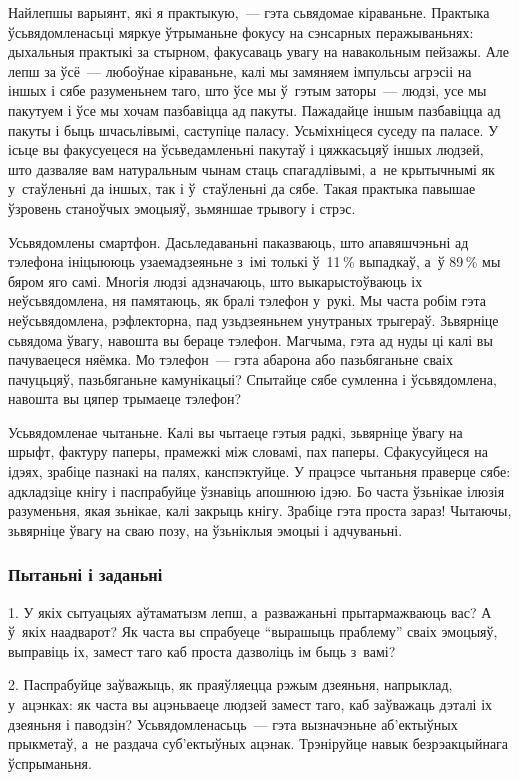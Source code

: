 Найлепшы варыянт, які я практыкую,~--- гэта сьвядомае кіраваньне. Практыка ўсьвядомленасьці мяркуе ўтрыманьне фокусу на сэнсарных перажываньнях: дыхальныя практыкі за стырном, факусаваць увагу на навакольным пейзажы. Але лепш за ўсё~--- любоўнае кіраваньне, калі мы замяняем імпульсы агрэсіі на іншых і сябе разуменьнем таго, што ўсе мы ў~гэтым заторы~--- людзі, усе мы пакутуем і ўсе мы хочам пазбавіцца ад пакуты. Пажадайце іншым пазбавіцца ад пакуты і быць шчасьлівымі, саступіце паласу. Усьміхніцеся суседу па паласе. У ісьце вы факусуецеся на ўсьведамленьні пакутаў і цяжкасьцяў іншых людзей, што дазваляе вам натуральным чынам стаць спагадлівымі, а~не крытычнымі як у~стаўленьні да іншых, так і ў~стаўленьні да сябе. Такая практыка павышае ўзровень станоўчых эмоцыяў, зьмяншае трывогу і стрэс.

Усьвядомлены смартфон. Дасьледаваньні паказваюць, што апавяшчэньні ад тэлефона ініцыююць узаемадзеяньне з~імі толькі ў~11\,\% выпадкаў, а~ў 89\,\% мы бяром яго самі. Многія людзі адзначаюць, што выкарыстоўваюць іх неўсьвядомлена, ня памятаюць, як бралі тэлефон у~рукі. Мы часта робім гэта неўсьвядомлена, рэфлекторна, пад узьдзеяньнем унутраных трыгераў. Зьвярніце сьвядома ўвагу, навошта вы бераце тэлефон. Магчыма, гэта ад нуды ці калі вы пачуваецеся няёмка. Мо тэлефон~--- гэта абарона або пазьбяганьне сваіх пачуцьцяў, пазьбяганьне камунікацыі? Спытайце сябе сумленна і ўсьвядомлена, навошта вы цяпер трымаеце тэлефон?

Усьвядомленае чытаньне. Калі вы чытаеце гэтыя радкі, зьвярніце ўвагу на шрыфт, фактуру паперы, прамежкі між словамі, пах паперы. Сфакусуйцеся на ідэях, зрабіце пазнакі на палях, канспэктуйце. У працэсе чытаньня праверце сябе: адкладзіце кнігу і паспрабуйце ўзнавіць апошнюю ідэю. Бо часта ўзьнікае ілюзія разуменьня, якая зьнікае, калі закрыць кнігу. Зрабіце гэта проста зараз! Чытаючы, зьвярніце ўвагу на сваю позу, на ўзьніклыя эмоцыі і адчуваньні.

\subsubsection{Пытаньні і заданьні}

1. У якіх сытуацыях аўтаматызм лепш, а~разважаньні прытармажваюць вас? А ў~якіх наадварот? Як часта вы спрабуеце ``вырашыць праблему'' сваіх эмоцыяў, выправіць іх, замест таго каб проста дазволіць ім быць з~вамі?

2. Паспрабуйце заўважыць, як праяўляецца рэжым дзеяньня, напрыклад, у~ацэнках: як часта вы ацэньваеце людзей замест таго, каб заўважаць дэталі іх дзеяньня і паводзін? Усьвядомленасьць~--- гэта вызначэньне аб'ектыўных прыкметаў, а~не раздача суб'ектыўных ацэнак. Трэніруйце навык безрэакцыйнага ўспрыманьня.

